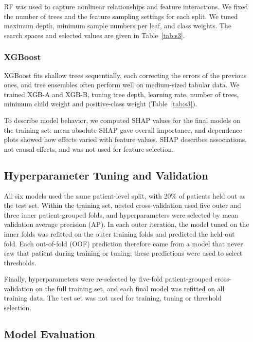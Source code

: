 \documentclass[twocolumn, 8pt]{article}
\begin{document}
RF was used to capture nonlinear relationships and feature interactions.\citep{breiman2001random} We fixed the number of trees and the feature sampling settings for each split. We tuned maximum depth, minimum sample numbers per leaf, and class weights. The search spaces and selected values are given in Table~\ref{tab:s3}.


\subsubsection{XGBoost}

XGBoost fits shallow trees sequentially, each correcting the errors of the previous ones,\cite{chen2016xgboost} and tree ensembles often perform well on medium-sized tabular data.\cite{grinsztajn2022tree} We trained XGB-A and XGB-B, tuning tree depth, learning rate, number of trees, minimum child weight and positive-class weight (Table~\ref{tab:s3}).

To describe model behavior, we computed SHAP values\cite{lundberg2017unified,lundberg2020local} for the final models on the training set: mean absolute SHAP gave overall importance, and dependence plots showed how effects varied with feature values. SHAP describes associations, not causal effects, and was not used for feature selection.

\subsection{Hyperparameter Tuning and Validation}
\label{sec:tuning}

All six models used the same patient-level split, with 20\% of patients held out as the test set. Within the training set, nested cross-validation used five outer and three inner patient-grouped folds, and hyperparameters were selected by mean validation average precision (AP).\cite{cawley2010overfitting} In each outer iteration, the model tuned on the inner folds was refitted on the outer training folds and predicted the held-out fold. Each out-of-fold (OOF) prediction therefore came from a model that never saw that patient during training or tuning; these predictions were used to select thresholds.

Finally, hyperparameters were re-selected by five-fold patient-grouped cross-validation on the full training set, and each final model was refitted on all training data. The test set was not used for training, tuning or threshold selection.

\subsection{Model Evaluation}
\label{sec:evaluation}
\end{document}

